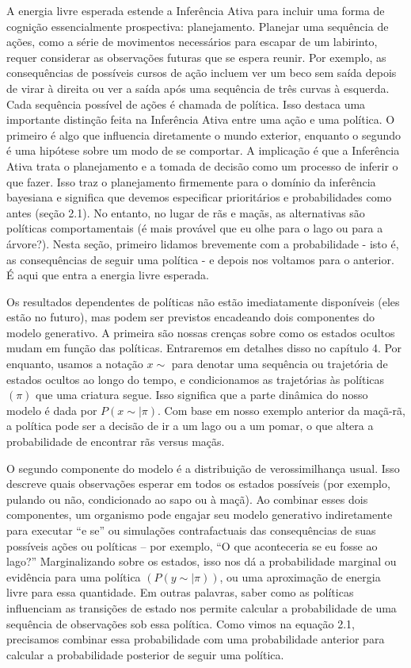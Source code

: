 \documentclass[
  12pt,
]{book}
\begin{document}
A energia livre esperada estende a Inferência Ativa para incluir uma forma de cognição essencialmente prospectiva: planejamento. Planejar uma sequência de ações, como a série de movimentos necessários para escapar de um labirinto, requer considerar as observações futuras que se espera reunir. Por exemplo, as consequências de possíveis cursos de ação incluem ver um beco sem saída depois de virar à direita ou ver a saída após uma sequência de três curvas à esquerda. Cada sequência possível de ações é chamada de política. Isso destaca uma importante distinção feita na Inferência Ativa entre uma ação e uma política. O primeiro é algo que influencia diretamente o mundo exterior, enquanto o segundo é uma hipótese sobre um modo de se comportar. A implicação é que a Inferência Ativa trata o planejamento e a tomada de decisão como um processo de inferir o que fazer. Isso traz o planejamento firmemente para o domínio da inferência bayesiana e significa que devemos especificar prioritários e probabilidades como antes (seção 2.1). No entanto, no lugar de rãs e maçãs, as alternativas são políticas comportamentais (é mais provável que eu olhe para o lago ou para a árvore?). Nesta seção, primeiro lidamos brevemente com a probabilidade - isto é, as consequências de seguir uma política - e depois nos voltamos para o anterior. É aqui que entra a energia livre esperada.

Os resultados dependentes de políticas não estão imediatamente disponíveis (eles estão no futuro), mas podem ser previstos encadeando dois componentes do modelo generativo. A primeira são nossas crenças sobre como os estados ocultos mudam em função das políticas. Entraremos em detalhes disso no capítulo 4. Por enquanto, usamos a notação \(x\sim\) para denotar uma sequência ou trajetória de estados ocultos ao longo do tempo, e condicionamos as trajetórias às políticas \((π)\) que uma criatura segue. Isso significa que a parte dinâmica do nosso modelo é dada por \(P(x\sim{}|π)\). Com base em nosso exemplo anterior da maçã-rã, a política pode ser a decisão de ir a um lago ou a um pomar, o que altera a probabilidade de encontrar rãs versus maçãs.

O segundo componente do modelo é a distribuição de verossimilhança usual. Isso descreve quais observações esperar em todos os estados possíveis (por exemplo, pulando ou não, condicionado ao sapo ou à maçã). Ao combinar esses dois componentes, um organismo pode engajar seu modelo generativo indiretamente para executar ``e se'' ou simulações contrafactuais das consequências de suas possíveis ações ou políticas -- por exemplo, ``O que aconteceria se eu fosse ao lago?'' Marginalizando sobre os estados, isso nos dá a probabilidade marginal ou evidência para uma política \((P(y\sim|π))\), ou uma aproximação de energia livre para essa quantidade. Em outras palavras, saber como as políticas influenciam as transições de estado nos permite calcular a probabilidade de uma sequência de observações sob essa política. Como vimos na equação 2.1, precisamos combinar essa probabilidade com uma probabilidade anterior para calcular a probabilidade posterior de seguir uma política.
\end{document}
